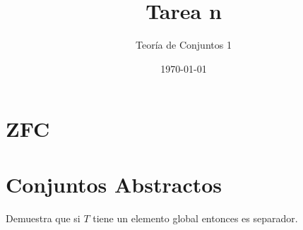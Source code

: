 \documentclass{article}
\title{Tarea n}
\author{Teoría de Conjuntos 1}
\date{\today}
\begin{document}
\maketitle

\section{ZFC}


\section{Conjuntos Abstractos}
\begin{exercise}
    Demuestra que si \(T\) tiene un elemento global entonces es separador.
\end{exercise}
\end{document}
